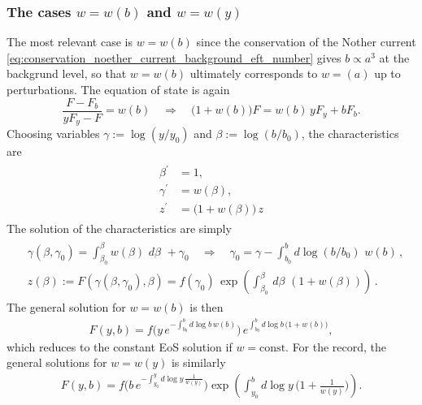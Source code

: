 \subsubsection{The cases $w=w(b)$ and $w=w(y)$}
%
The most relevant case is $w=w(b)$ since the conservation of the Nother current \eqref{eq:conservation_noether_current_background_eft_number} gives $b\propto a^3$ at the backgrund level, so that  $w=w(b)$ ultimately corresponds to $w=(a)$ up to perturbations.
The equation of state is again
\begin{equation}\label{eq:eos_pde_w_depending_b}
    \frac{F-F_b}{yF_y-F}=w(b)\quad\Rightarrow\quad \big(1+w(b)\big)F=w(b)\, yF_y+bF_b.
\end{equation}
Choosing variables $\gamma:=\log (y/y_0)$ and $\beta:=\log (b/b_0)$, the characteristics are
{\small
\begin{align}\label{eq:characteristics_eos_pde_w_depending_b}
\begin{aligned}
    \beta^\prime&=1,\\
    \gamma^\prime&=w(\beta),\\
    z^\prime&=\big(1+w(\beta)\big)\,z
\end{aligned}\end{align}
}
The solution of the characteristics are simply 
{\small\begin{align}\label{eq:characteristics_eos_pde_solution_w_depending_b}
\begin{aligned}
    &\gamma(\beta,\gamma_0)=\int_{\beta_0}^\beta w(\beta)\,\,d\beta\,\,+\gamma_0\quad\Rightarrow\quad \gamma_0=\gamma-\int_{b_0}^b \!\!d\log(b/b_0)\,\, w(b)\,,\\
    &z(\beta):=F(\gamma(\beta,\gamma_0),\beta)= f(\gamma_0)\,\exp\left(\int_{\beta_0}^\beta\, d\beta\,\,(1+w(\beta))\right)\,.
\end{aligned}\end{align}}
The general solution for $w=w(b)$ is then
\begin{align}\label{eq:eos_pde_solution_w_depending_b}
    F(y,b)=f\Big(y\, e^{-\int_{b_0}^bd\log b\, w(b)}\Big)\, e^{\int_{b_0}^bd\log b\, \big(1+w(b)\big)},
\end{align}
which reduces to the constant EoS solution if $w=\text{const}$.
For the record, the general solutions for $w=w(y)$ is similarly 
\begin{align}
    F(y,b)=f\Big(b\, e^{-\int_{y_0}^yd\log y\, \frac{1}{w(y)}}\Big)\exp\left(\int_{y_0}^bd\log y\,\Big(1+\tfrac{1}{w(y)}\Big)\right).
\end{align}


